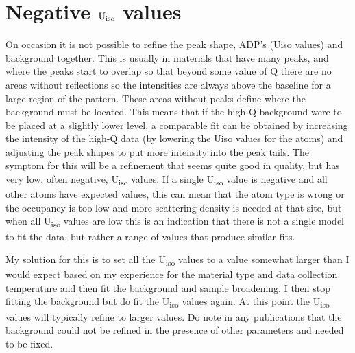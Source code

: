 \section{Negative \texorpdfstring{$\rm U_{iso}$}{Uiso} values}\label{ref:negativeUiso}
On occasion it is not possible to refine the peak shape, ADP’s (Uiso values) and background together. This is usually in materials that have many peaks, and where the peaks start to overlap so that beyond some value of Q there are no areas without reflections so the intensities are always above the baseline for a large region of the pattern. These areas without peaks define where the background must be located. This means that if the high-Q background were to be placed at a slightly lower level, a comparable fit can be obtained by increasing the intensity of the high-Q data (by lowering the Uiso values for the atoms) and adjusting the peak shapes to put more intensity into the peak tails. The symptom for this will be a refinement that seems quite good in quality, but has very low, often negative, U\textsubscript{iso} values. If a single U\textsubscript{iso} value is negative and all other atoms have expected values, this can mean that the atom type is wrong or the occupancy is too low and more scattering density is needed at that site, but when all U\textsubscript{iso} values are low this is an indication that there is not a single model to fit the data, but rather a range of values that produce similar fits. 

 My solution for this is to set all the U\textsubscript{iso} values to a value somewhat larger than I would expect based on my experience for the material type and data collection temperature and then fit the background and sample broadening. I then stop fitting the background but do fit the U\textsubscript{iso} values again. At this point the U\textsubscript{iso} values will typically refine to larger values. Do note in any publications that the background could not be refined in the presence of other parameters and needed to be fixed. 